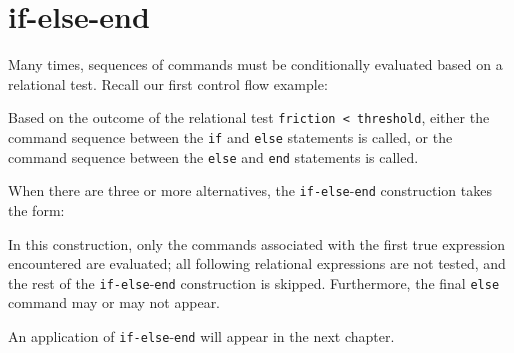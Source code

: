 \section{if-else-end}


Many times, sequences of commands must be conditionally evaluated based on a relational test. Recall our first control flow example:


\noindent Based on the outcome of the relational test {\tt friction < threshold}, either the command sequence between the {\tt if} and {\tt else} statements is called, or the command sequence between the {\tt else} and {\tt end} statements is called.

\vspace{1em}

\noindent When there are three or more alternatives, the {\tt if-}{\tt else}-{\tt end} construction takes the form: 

\noindent In this construction, only the commands associated with the first true expression encountered are evaluated; all following relational expressions are not tested, and the rest of the {\tt if-}{\tt else}-{\tt end} construction is skipped. Furthermore, the final {\tt else} command may or may not appear.

\vspace{1em}
\noindent An application of {\tt if-}{\tt else}-{\tt end} will appear in the next chapter.
 

